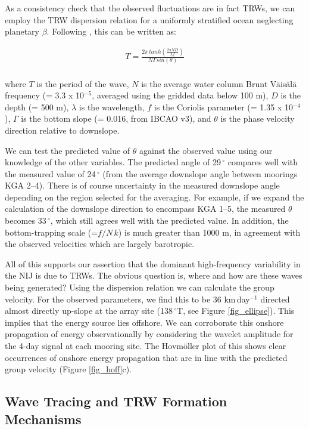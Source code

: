 \documentclass[12pt,titlepage,figuresatend]{article}
\begin{document}
As a consistency check that the observed fluctuations are in fact TRWs, we can employ the TRW dispersion relation for a uniformly stratified ocean neglecting planetary $\beta$. Following \cite{Pedlosky1979}, this can be written as:

\begin{eqnarray*}
  T = \frac{2\pi \,tanh(\frac{2\pi ND}{\lambda f})}{N\Gamma sin(\theta)}\\
\end{eqnarray*}

where $T$ is the period of the wave, $N$ is the average water column Brunt V{\"a}is{\"a}l{\"a} frequency (= 3.3 x 10$^{-5}$, averaged using the gridded data below 100 m), $D$ is the depth (= 500 m), $\lambda$ is the wavelength, $f$ is the Coriolis parameter (= 1.35 x 10$^{-4}$), $\Gamma$ is the bottom slope (= 0.016, from IBCAO v3), and $\theta$ is the phase velocity direction relative to downslope.

We can test the predicted value of $\theta$ against the observed value using our knowledge of the other variables. The predicted angle of 29$\,^{\circ}$ compares well with the measured value of 24$\,^{\circ}$ (from the average downslope angle between moorings KGA 2--4). There is of course uncertainty in the measured downslope angle depending on the region selected for the averaging. For example, if we expand the calculation of the downslope direction to encompass KGA 1--5, the measured $\theta$ becomes 33$\,^{\circ}$, which still agrees well with the predicted value. In addition, the bottom-trapping scale (=$f/N\,k$) is much greater than 1000 m, in agreement with the observed velocities which are largely barotropic. 

All of this supports our assertion that the dominant high-frequency variability in the NIJ is due to TRWs. The obvious question is, where and how are these waves being generated? Using the dispersion relation we can calculate the group velocity. For the observed parameters, we find this to be 36 km$\,$day$^{-1}$ directed almost directly up-slope at the array site (138$\,^{\circ}$T, see Figure \ref{fig_ellipse}). This implies that the energy source lies offshore. We can corroborate this onshore propagation of energy observationally by considering the wavelet amplitude for the 4-day signal at each mooring site. The Hovm\"{o}ller plot of this shows clear occurrences of onshore energy propagation that are in line with the predicted group velocity (Figure \ref{fig_hoff}c). 

\subsection{Wave Tracing and TRW Formation Mechanisms}
\end{document}
